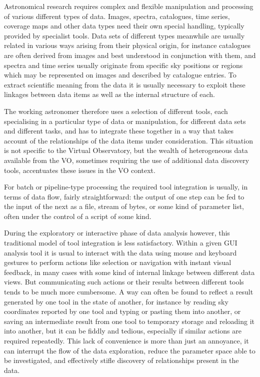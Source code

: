 \documentclass[5p]{elsarticle}
\begin{document}
Astronomical research requires complex and flexible manipulation
and processing of various different types of data.
Images, spectra, catalogues, time series, coverage maps and other data
types need their own special handling,
typically provided by specialist tools.
Data sets of different types meanwhile are usually related
in various ways arising from their physical origin,
for instance
catalogues are often derived from images and best understood in
conjunction with them, and
spectra and time series usually originate from specific sky positions
or regions which may be represented on images and described by
catalogue entries.
To extract scientific meaning from the data it is usually necessary
to exploit these linkages between data items as well as the
internal structure of each.

The working astronomer therefore uses a selection of different tools,
each specialising in a particular type of data or manipulation,
for different data sets and different tasks,
and has to integrate these together in a way that takes account of
the relationships of the data items under consideration.
This situation is not specific to the Virtual Observatory,
but the wealth of heterogeneous data available from the VO,
sometimes requiring the use of additional data discovery tools,
accentuates these issues in the VO context.

For batch or pipeline-type processing the required tool integration
is usually, in terms of data flow, fairly straightforward:
the output of one step can be fed to the input of the next as a file,
stream of bytes, or some kind of parameter list,
often under the control of a script of some kind.

During the exploratory or interactive phase of data analysis however,
this traditional model of tool integration is less satisfactory.
Within a given GUI analysis
tool it is usual to interact with the data using
mouse and keyboard gestures to perform actions like selection or
navigation with instant visual feedback, in many cases with some
kind of internal linkage between different data views.
But communicating such actions or their results between different
tools tends to be much more cumbersome.
A way can often be found to reflect a result generated by one tool
in the state of another, for instance by reading sky coordinates
reported by one tool and typing or pasting them into another,
or saving an intermediate result from one tool to temporary storage
and reloading it into another, but it can be fiddly and tedious,
especially if similar actions are required repeatedly.
This lack of convenience is more than just an annoyance, it can
interrupt the flow of the data exploration, reduce the parameter
space able to be investigated, and effectively stifle discovery
of relationships present in the data.
\end{document}
